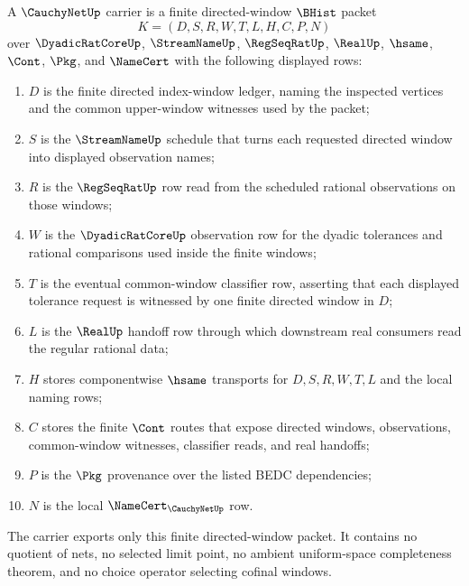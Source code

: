 \begin{definition}
\label{def:cauchy-net-carrier}
A $\CauchyNetUp$ carrier is a finite directed-window $\BHist$ packet
$$
K=(D,S,R,W,T,L,H,C,P,N)
$$
over $\DyadicRatCoreUp$, $\StreamNameUp$, $\RegSeqRatUp$, $\RealUp$, $\hsame$, $\Cont$, $\Pkg$, and $\NameCert$ with the following displayed rows:
\begin{enumerate}
\item $D$ is the finite directed index-window ledger, naming the inspected vertices and the common upper-window witnesses used by the packet;
\item $S$ is the $\StreamNameUp$ schedule that turns each requested directed window into displayed observation names;
\item $R$ is the $\RegSeqRatUp$ row read from the scheduled rational observations on those windows;
\item $W$ is the $\DyadicRatCoreUp$ observation row for the dyadic tolerances and rational comparisons used inside the finite windows;
\item $T$ is the eventual common-window classifier row, asserting that each displayed tolerance request is witnessed by one finite directed window in $D$;
\item $L$ is the $\RealUp$ handoff row through which downstream real consumers read the regular rational data;
\item $H$ stores componentwise $\hsame$ transports for $D,S,R,W,T,L$ and the local naming rows;
\item $C$ stores the finite $\Cont$ routes that expose directed windows, observations, common-window witnesses, classifier reads, and real handoffs;
\item $P$ is the $\Pkg$ provenance over the listed BEDC dependencies;
\item $N$ is the local $\NameCert_{\CauchyNetUp}$ row.
\end{enumerate}
The carrier exports only this finite directed-window packet. It contains no quotient of nets, no selected limit point, no ambient uniform-space completeness theorem, and no choice operator selecting cofinal windows.
\end{definition}

